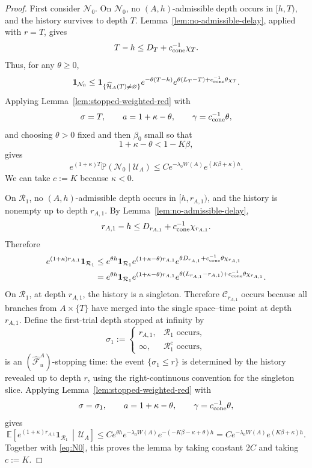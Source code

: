 \documentclass[letterpaper,11pt,reqno]{amsart}
\theoremstyle{definition}
\begin{document}
\begin{proof}
First consider \(\mathcal N_0\). On \(\mathcal N_0\), no \((A,h)\)-admissible depth
occurs in \([h,T)\), and the history survives to depth \(T\).
Lemma~\ref{lem:no-admissible-delay}, applied with \(r=T\), gives
\[
        T-h
        \le
        D_T+c_{\rm cone}^{-1}\chi_T.
\]
Thus, for any $\theta\geq 0$,
\[
        \mathbf 1_{\mathcal N_0}
        \le
        \mathbf 1_{\{\widehat{\mathcal H}_A(T)\ne\varnothing\}}
        e^{-\theta(T-h)}
        e^{\theta(L_T-T)+c_{\rm cone}^{-1}\theta\chi_T}.
\]
Applying Lemma~\ref{lem:stopped-weighted-red} with
\[
        \sigma=T,
        \qquad
        a=1+\kappa-\theta,
        \qquad
        \gamma=c_{\rm cone}^{-1}\theta,
\]
and choosing \(\theta>0\) fixed and then \(\beta_0\) small so that
\[
        1+\kappa-\theta<1-K\beta,
\]
gives
\begin{equation}\label{eq:N0}
    e^{(1+\kappa) T}
        \mathbb P(\mathcal N_0\mid\mathcal U_A)
        \le
        C e^{-\lambda_0W(A)}e^{(K\beta+\kappa)h}.
\end{equation}
We can take $c:=K$ because $\kappa<0$.
        



On \(\mathcal R_1\), no \((A,h)\)-admissible depth occurs in \([h,r_{A,1})\), and the
history is nonempty up to depth \(r_{A,1}\). By
Lemma~\ref{lem:no-admissible-delay},
\[
        r_{A,1}-h
        \le
        D_{r_{A,1}}+c_{\rm cone}^{-1}\chi_{r_{A,1}}.
\]
Therefore
\[
\begin{aligned}
e^{(1+\kappa)r_{A,1}}\mathbf 1_{\mathcal R_1}
&\le
e^{\theta h}
\mathbf 1_{\mathcal R_1}
e^{(1+\kappa-\theta)r_{A,1}}
e^{\theta D_{r_{A,1}}+c_{\rm cone}^{-1}\theta\chi_{r_{A,1}}}                      \\
&=
e^{\theta h }
\mathbf 1_{\mathcal R_1}
e^{(1+\kappa-\theta)r_{A,1}}
e^{\theta(L_{r_{A,1}}-r_{A,1})+c_{\rm cone}^{-1}\theta\chi_{r_{A,1}}} .
\end{aligned}
\]
On \(\mathcal R_1\), at depth \(r_{A,1}\), the history is a singleton. Therefore
\(\mathcal C_{r_{A,1}}\) occurs because all branches from \(A\times\{T\}\) have
merged into the single space--time point at depth \(r_{A,1}\). Define the
first-trial depth stopped at infinity by
\[
        \sigma_1
        :=
        \begin{cases}
        r_{A,1},&\mathcal R_1\text{ occurs},\\
        \infty,&\mathcal R_1^c\text{ occurs},
        \end{cases}
\]
is an \((\widehat{\mathscr F}_u^A)\)-stopping time: the event \(\{\sigma_1\le r\}\) is
determined by the history revealed up to depth \(r\), using the right-continuous
convention for the singleton slice. Applying
Lemma~\ref{lem:stopped-weighted-red} with
\[
        \sigma=\sigma_1,
        \qquad
        a=1+\kappa-\theta,
        \qquad
        \gamma=c_{\rm cone}^{-1}\theta,
\]
gives
\[
\mathbb E
\left[
e^{(1+\kappa)r_{A,1}}\mathbf 1_{\mathcal R_1}
\,\middle|\,
\mathcal U_A
\right]
\le
C e^{\theta h}
e^{-\lambda_0W(A)}
e^{-(-K\beta-\kappa+\theta)h} 
=C 
e^{-\lambda_0W(A)}
e^{(K\beta+\kappa)h}.
\]
Together with \eqref{eq:N0}, this proves the lemma by taking constant $2C$ and taking $c:=K$.
\end{proof}
\end{document}
